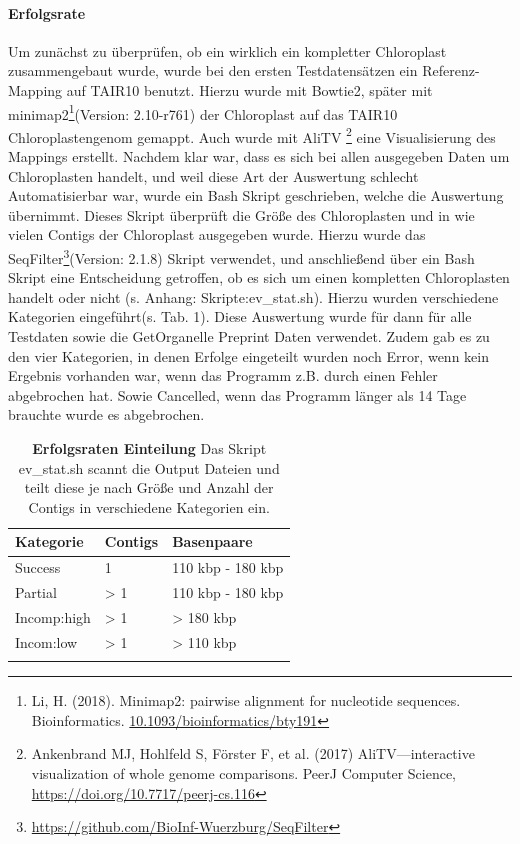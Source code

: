 \documentclass{scrartcl}
\begin{document}
\paragraph{Erfolgsrate}
\label{sec-3-2-2-2}
Um zunächst zu überprüfen, ob ein wirklich ein kompletter Chloroplast zusammengebaut wurde, wurde bei den ersten Testdatensätzen ein Referenz-Mapping auf
TAIR10 benutzt. Hierzu wurde mit Bowtie2, später mit minimap2\footnote{Li, H. (2018). Minimap2: pairwise alignment for nucleotide sequences. Bioinformatics. \url{10.1093/bioinformatics/bty191}}(Version: 2.10-r761) der Chloroplast auf das TAIR10 Chloroplastengenom gemappt. Auch wurde mit AliTV \footnote{Ankenbrand MJ, Hohlfeld S, Förster F, et al. (2017) AliTV—interactive visualization of whole genome comparisons. PeerJ Computer Science, \url{https://doi.org/10.7717/peerj-cs.116}} 
eine Visualisierung des Mappings erstellt. Nachdem klar war, dass es sich bei allen ausgegeben Daten um Chloroplasten handelt, und weil diese Art der 
Auswertung schlecht Automatisierbar war, wurde ein Bash Skript geschrieben, welche die Auswertung übernimmt. Dieses Skript überprüft die Größe des
Chloroplasten und in wie vielen Contigs der Chloroplast ausgegeben wurde. Hierzu wurde das SeqFilter\footnote{\url{https://github.com/BioInf-Wuerzburg/SeqFilter}}(Version: 2.1.8) Skript verwendet, und anschließend über ein Bash
Skript eine Entscheidung getroffen, ob es sich um einen kompletten Chloroplasten handelt oder nicht (s. Anhang: Skripte:ev\_stat.sh). Hierzu wurden verschiedene
Kategorien eingeführt(s. Tab. 1). Diese Auswertung wurde für dann für alle Testdaten sowie die GetOrganelle Preprint Daten verwendet. Zudem gab es zu den vier Kategorien, in denen
Erfolge eingeteilt wurden noch Error, wenn kein Ergebnis vorhanden war, wenn das Programm z.B. durch einen Fehler abgebrochen hat. Sowie Cancelled, wenn das Programm länger als 14 Tage brauchte 
wurde es abgebrochen.
\begin{table}[!h]
\caption[Erfolgsraten Einteilung]{\textbf{Erfolgsraten Einteilung} Das Skript ev\_stat.sh scannt die Output Dateien und teilt diese je nach Größe und Anzahl der Contigs in verschiedene Kategorien ein. }
\begin{center}
\begin{tabular}{lll}
Kategorie & Contigs & Basenpaare\\
\hline
Success & 1 & 110 kbp - 180 kbp\\
Partial & > 1 & 110 kbp - 180 kbp\\
Incomp:high & > 1 & > 180 kbp\\
Incom:low & > 1 & > 110 kbp\\
 &  & \\
\end{tabular}
\end{center}
\end{table}
\end{document}
